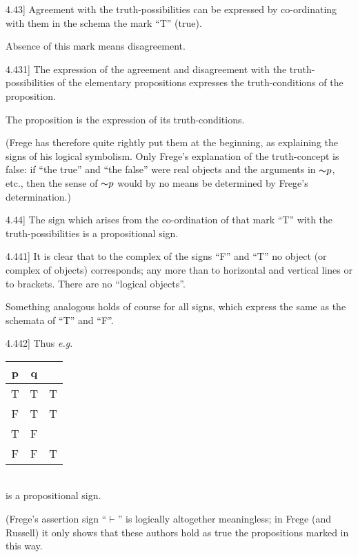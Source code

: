 \documentclass[12pt,oneside]{book}[2007/10/19]
\newcommand{\PropositionE}[2]{%
  \item[\phantomsection\label{PropE:#1}\PropGRef{#1}] #2%
}
\newcommand{\PropGRef}[1]{\hyperref[PropG:#1]{#1}}
\newcommand{\Not}[1]{\mathord{\thicksim} #1}
\newcommand{\exempliGratia}{\textit{e.g.}}
\newcommand{\Strut}[1][12pt]{\rule{0pt}{#1}}
\begin{document}
\begin{propositions}
\PropositionE{4.43}
{Agreement with the truth-possibilities can be
expressed by co-or\-di\-na\-ting with them in the
schema the mark ``T'' (true).

Absence of this mark means disagreement.}


\PropositionE{4.431}
{The expression of the agreement and disagreement
with the truth-pos\-si\-bil\-i\-ties of the elementary
propositions expresses the truth-conditions of the
proposition.

The proposition is the expression of its truth-conditions.

(Frege has therefore quite rightly put them at
the beginning, as explaining the signs of his
logical symbolism. Only Frege's explanation
of the truth-concept is false: if ``the true'' and
``the false'' were real objects and the arguments
in $\Not{p}$, etc., then the sense of $\Not{p}$ would by no
means be determined by Frege's determination.)}


\PropositionE{4.44}
{The sign which arises from the co-ordination of
that mark ``T'' with the truth-pos\-si\-bil\-i\-ties is a
propositional sign.}


\PropositionE{4.441}
{It is clear that to the complex of the signs ``F''
and ``T'' no object (or complex of objects) corresponds;
any more than to horizontal and vertical
lines or to brackets. There are no ``logical
objects''.

Something analogous holds of course for all
signs, which express the same as the schemata of
``T'' and ``F''.}


\PropositionE{4.442}
{Thus \exempliGratia\\
\phantom{Thus \exempliGratia}
\raisebox{2.4\baselineskip}{``}\begin{tabular}{c|c|c}
p & q &\\
\hline
\hline
\Strut T & T & T\\
\hline
\Strut F & T & T\\
\hline
\Strut T & F &\\
\hline
\Strut F & F & T\\
\hline
\end{tabular}\\
\phantom{Thus \exempliGratia\ ``\begin{tabular}[t]{c|c|c}F&F&T\end{tabular}}
\smash[t]{\raisebox{1.2\baselineskip}{''}}is a propositional sign.

(Frege's assertion sign ``$\vdash$'' is logically altogether
meaningless; in Frege (and Russell) it only shows
that these authors hold as true the propositions
marked in this way.

}
\end{propositions}
\end{document}

